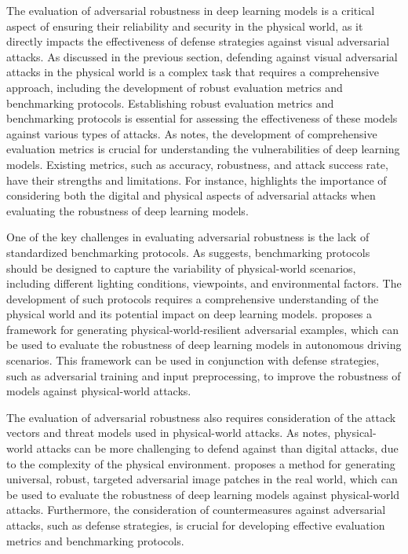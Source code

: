 \documentclass[11pt,a4paper]{article}
\begin{document}
The evaluation of adversarial robustness in deep learning models is a critical aspect of ensuring their reliability and security in the physical world, as it directly impacts the effectiveness of defense strategies against visual adversarial attacks. As discussed in the previous section, defending against visual adversarial attacks in the physical world is a complex task that requires a comprehensive approach, including the development of robust evaluation metrics and benchmarking protocols. Establishing robust evaluation metrics and benchmarking protocols is essential for assessing the effectiveness of these models against various types of attacks. As \cite{arxiv:1911.05268} notes, the development of comprehensive evaluation metrics is crucial for understanding the vulnerabilities of deep learning models. Existing metrics, such as accuracy, robustness, and attack success rate, have their strengths and limitations. For instance, \cite{doi:10.1016/j.eng.2019.12.012} highlights the importance of considering both the digital and physical aspects of adversarial attacks when evaluating the robustness of deep learning models.

One of the key challenges in evaluating adversarial robustness is the lack of standardized benchmarking protocols. As \cite{doi:10.1109/cvpr42600.2020.00108} suggests, benchmarking protocols should be designed to capture the variability of physical-world scenarios, including different lighting conditions, viewpoints, and environmental factors. The development of such protocols requires a comprehensive understanding of the physical world and its potential impact on deep learning models. \cite{doi:10.1109/cvpr42600.2020.01426} proposes a framework for generating physical-world-resilient adversarial examples, which can be used to evaluate the robustness of deep learning models in autonomous driving scenarios. This framework can be used in conjunction with defense strategies, such as adversarial training and input preprocessing, to improve the robustness of models against physical-world attacks.

The evaluation of adversarial robustness also requires consideration of the attack vectors and threat models used in physical-world attacks. As \cite{arxiv:1707.08945} notes, physical-world attacks can be more challenging to defend against than digital attacks, due to the complexity of the physical environment. \cite{arxiv:1712.09665} proposes a method for generating universal, robust, targeted adversarial image patches in the real world, which can be used to evaluate the robustness of deep learning models against physical-world attacks. Furthermore, the consideration of countermeasures against adversarial attacks, such as defense strategies, is crucial for developing effective evaluation metrics and benchmarking protocols.
\end{document}
